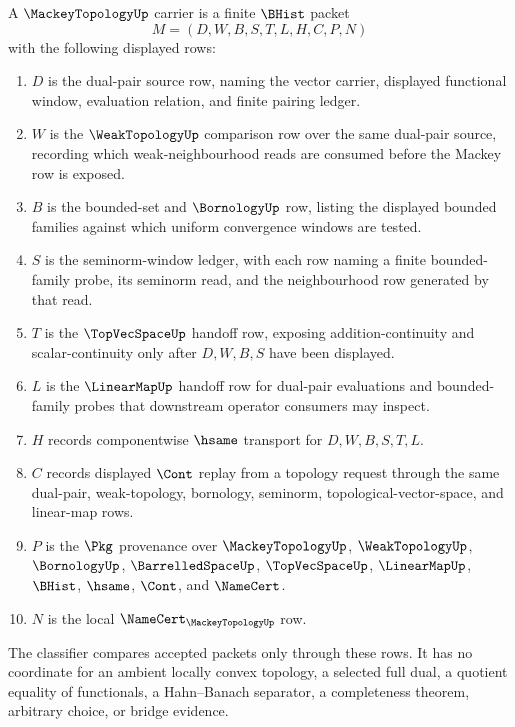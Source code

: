 \begin{definition}
\label{def:mackey-topology-carrier}
A $\MackeyTopologyUp$ carrier is a finite $\BHist$ packet
$$
M=(D,W,B,S,T,L,H,C,P,N)
$$
with the following displayed rows:
\begin{enumerate}
\item $D$ is the dual-pair source row, naming the vector carrier, displayed functional window, evaluation relation, and finite pairing ledger.
\item $W$ is the $\WeakTopologyUp$ comparison row over the same dual-pair source, recording which weak-neighbourhood reads are consumed before the Mackey row is exposed.
\item $B$ is the bounded-set and $\BornologyUp$ row, listing the displayed bounded families against which uniform convergence windows are tested.
\item $S$ is the seminorm-window ledger, with each row naming a finite bounded-family probe, its seminorm read, and the neighbourhood row generated by that read.
\item $T$ is the $\TopVecSpaceUp$ handoff row, exposing addition-continuity and scalar-continuity only after $D,W,B,S$ have been displayed.
\item $L$ is the $\LinearMapUp$ handoff row for dual-pair evaluations and bounded-family probes that downstream operator consumers may inspect.
\item $H$ records componentwise $\hsame$ transport for $D,W,B,S,T,L$.
\item $C$ records displayed $\Cont$ replay from a topology request through the same dual-pair, weak-topology, bornology, seminorm, topological-vector-space, and linear-map rows.
\item $P$ is the $\Pkg$ provenance over $\MackeyTopologyUp$, $\WeakTopologyUp$, $\BornologyUp$, $\BarrelledSpaceUp$, $\TopVecSpaceUp$, $\LinearMapUp$, $\BHist$, $\hsame$, $\Cont$, and $\NameCert$.
\item $N$ is the local $\NameCert_{\MackeyTopologyUp}$ row.
\end{enumerate}
The classifier compares accepted packets only through these rows. It has no coordinate for an ambient locally convex topology, a selected full dual, a quotient equality of functionals, a Hahn--Banach separator, a completeness theorem, arbitrary choice, or bridge evidence.
\end{definition}

